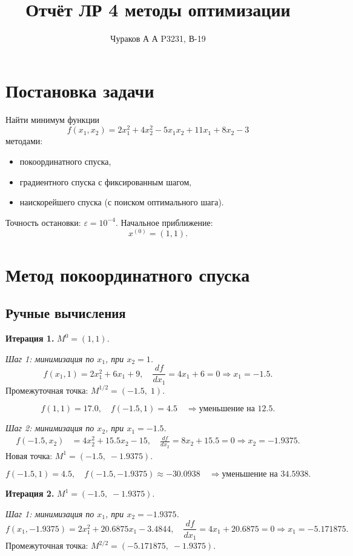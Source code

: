 \documentclass{article}
\begin{document}
\title{Отчёт ЛР 4 методы оптимизации}
\author{Чураков А А P3231, В-19}
\maketitle

\section{Постановка задачи}
Найти минимум функции
\[
f(x_1,x_2)=2x_1^2+4x_2^2-5x_1x_2+11x_1+8x_2-3
\]
методами:
\begin{itemize}
  \item покоординатного спуска,
  \item градиентного спуска с фиксированным шагом,
  \item наискорейшего спуска (с поиском оптимального шага).
\end{itemize}
Точность остановки: $\varepsilon=10^{-4}$. Начальное приближение:
\[
x^{(0)}=(1,1).
\]

\section{Метод покоординатного спуска}
\subsection{Ручные вычисления}

\textbf{Итерация 1.} $M^0=(1,1)$.

\medskip
\emph{Шаг 1: минимизация по $x_1$, при $x_2=1$.}
\[
f(x_1,1) = 2x_1^2 + 6x_1 + 9, \quad \frac{df}{dx_1} = 4x_1 + 6 = 0 \Rightarrow x_1 = -1.5.
\]
Промежуточная точка: $M^{1/2} = (-1.5,\;1)$.

\[
f(1,1) = 17.0,\quad f(-1.5,1) = 4.5 \quad \Rightarrow \text{уменьшение на } 12.5.
\]

\medskip
\emph{Шаг 2: минимизация по $x_2$, при $x_1=-1.5$.}
\begin{align*}
f(-1.5,x_2) &= 4x_2^2 + 15.5x_2 - 15, \quad \frac{df}{dx_2} = 8x_2 + 15.5 = 0 \Rightarrow x_2 = -1.9375.
\end{align*}
Новая точка: $M^1 = (-1.5,\;-1.9375)$.

\[
f(-1.5,1) = 4.5,\quad f(-1.5,-1.9375) \approx -30.0938 \quad \Rightarrow \text{уменьшение на } 34.5938.
\]

\bigskip
\textbf{Итерация 2.} $M^1 = (-1.5,\;-1.9375)$.

\medskip
\emph{Шаг 1: минимизация по $x_1$, при $x_2 = -1.9375$.}
\[
f(x_1,-1.9375) = 2x_1^2 + 20.6875x_1 - 3.4844, \quad \frac{df}{dx_1} = 4x_1 + 20.6875 = 0 \Rightarrow x_1 = -5.171875.
\]
Промежуточная точка: $M^{2/2} = (-5.171875,\;-1.9375)$.
\end{document}
